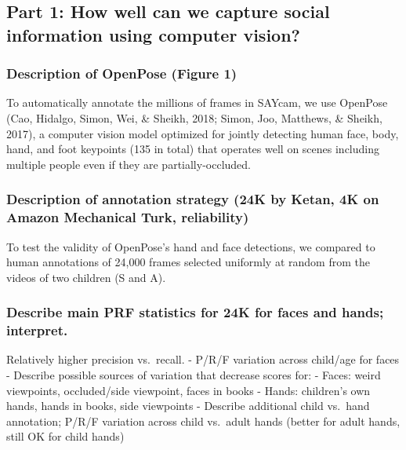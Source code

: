 \documentclass[10pt, letterpaper]{article}
\begin{document}
\hypertarget{part-1-how-well-can-we-capture-social-information-using-computer-vision}{%
\subsection{Part 1: How well can we capture social information using
computer
vision?}\label{part-1-how-well-can-we-capture-social-information-using-computer-vision}}

\hypertarget{description-of-openpose-figure-1}{%
\subsubsection{Description of OpenPose (Figure
1)}\label{description-of-openpose-figure-1}}

To automatically annotate the millions of frames in SAYcam, we use
OpenPose (Cao, Hidalgo, Simon, Wei, \& Sheikh, 2018; Simon, Joo,
Matthews, \& Sheikh, 2017), a computer vision model optimized for
jointly detecting human face, body, hand, and foot keypoints (135 in
total) that operates well on scenes including multiple people even if
they are partially-occluded.

\hypertarget{description-of-annotation-strategy-24k-by-ketan-4k-on-amazon-mechanical-turk-reliability}{%
\subsubsection{Description of annotation strategy (24K by Ketan, 4K on
Amazon Mechanical Turk,
reliability)}\label{description-of-annotation-strategy-24k-by-ketan-4k-on-amazon-mechanical-turk-reliability}}

To test the validity of OpenPose's hand and face detections, we compared
to human annotations of 24,000 frames selected uniformly at random from
the videos of two children (S and A).

\hypertarget{describe-main-prf-statistics-for-24k-for-faces-and-hands-interpret.}{%
\subsubsection{Describe main PRF statistics for 24K for faces and hands;
interpret.}\label{describe-main-prf-statistics-for-24k-for-faces-and-hands-interpret.}}

Relatively higher precision vs.~recall. - P/R/F variation across
child/age for faces - Describe possible sources of variation that
decrease scores for: - Faces: weird viewpoints, occluded/side viewpoint,
faces in books - Hands: children's own hands, hands in books, side
viewpoints - Describe additional child vs.~hand annotation; P/R/F
variation across child vs.~adult hands (better for adult hands, still OK
for child hands)
\end{document}
